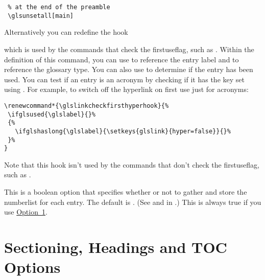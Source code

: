 \documentclass[report,inlinetitle]{nlctdoc}
\newcommand*{\opt}[1]{\hyperlink{option#1}{Option~#1}}
\newcommand*{\firstuseflag}{\gls{firstuseflag}}
\newcommand*{\gloskey}[2][newglossaryentry]{\csopt{#1}{#2}}
\begin{document}
\begin{description}
\begin{verbatim}
 % at the end of the preamble
 \glsunsetall[main]
\end{verbatim}

Alternatively you can redefine the hook
\begin{definition}[\DescribeMacro\glslinkcheckfirsthyperhook]
\end{definition}
which is used by the commands that check the \firstuseflag, such
as . Within the definition of this command, you can use
 to reference the entry label and  to
reference the glossary type. You can also use 
to determine if the entry has been used. You can test if an entry is
an acronym by checking if it has the \gloskey{long} key set using
. For example, to switch off the hyperlink on
first use just for acronyms:
\begin{verbatim}
\renewcommand*{\glslinkcheckfirsthyperhook}{%
 \ifglsused{\glslabel}{}%
 {%
   \ifglshaslong{\glslabel}{\setkeys{glslink}{hyper=false}}{}%
 }%
}
\end{verbatim}

Note that this hook isn't used by the commands that don't check the
\firstuseflag, such as .

\item[\pkgopt{savenumberlist}] This is a boolean option that
specifies whether or not to gather and store the \gls{numberlist}
for each entry. The default is . (See
 and  in
.) This is always true if you
use \opt1.

\end{description}

\section{Sectioning, Headings and TOC Options}
\label{sec:pkgopts-sec}
\end{document}
